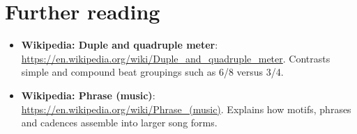 \section*{Further reading}
\begin{itemize}
  \item \textbf{Wikipedia: Duple and quadruple meter}: \url{https://en.wikipedia.org/wiki/Duple_and_quadruple_meter}. Contrasts simple and compound beat groupings such as 6/8 versus 3/4.
  \item \textbf{Wikipedia: Phrase (music)}: \url{https://en.wikipedia.org/wiki/Phrase_(music)}. Explains how motifs, phrases and cadences assemble into larger song forms.
\end{itemize}
